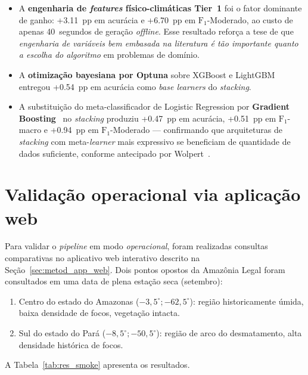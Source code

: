 \begin{itemize}
  \item A \textbf{engenharia de \emph{features} físico-climáticas Tier~1} foi o fator dominante de ganho: +\SI{3,11}{pp} em acurácia e +\SI{6,70}{pp} em \(\text{F}_1\)-Moderado, ao custo de apenas 40~segundos de geração \emph{offline}. Esse resultado reforça a tese de que \emph{engenharia de variáveis bem embasada na literatura é tão importante quanto a escolha do algoritmo} em problemas de domínio.

  \item A \textbf{otimização bayesiana por Optuna} sobre XGBoost e LightGBM~\cite{akiba2019optuna} entregou +\SI{0,54}{pp} em acurácia como \emph{base learners} do \emph{stacking}.

  \item A substituição do meta-classificador de Logistic Regression por \textbf{Gradient Boosting}~\cite{friedman2001greedy} no \emph{stacking} produziu +\SI{0,47}{pp} em acurácia, +\SI{0,51}{pp} em \(\text{F}_1\)-macro e +\SI{0,94}{pp} em \(\text{F}_1\)-Moderado --- confirmando que arquiteturas de \emph{stacking} com meta-\emph{learner} mais expressivo se beneficiam de quantidade de dados suficiente, conforme antecipado por Wolpert~\cite{wolpert1992stacked}.
\end{itemize}

\section{Validação operacional via aplicação web}
\label{sec:res_app}

Para validar o \emph{pipeline} em modo \emph{operacional}, foram realizadas consultas comparativas no aplicativo web interativo descrito na Seção~\ref{sec:metod_app_web}. Dois pontos opostos da Amazônia Legal foram consultados em uma data de plena estação seca (setembro):

\begin{enumerate}
  \item Centro do estado do Amazonas (\(-3{,}5^\circ; -62{,}5^\circ\)): região historicamente úmida, baixa densidade de focos, vegetação intacta.
  \item Sul do estado do Pará (\(-8{,}5^\circ; -50{,}5^\circ\)): região de arco do desmatamento, alta densidade histórica de focos.
\end{enumerate}

A Tabela~\ref{tab:res_smoke} apresenta os resultados.

